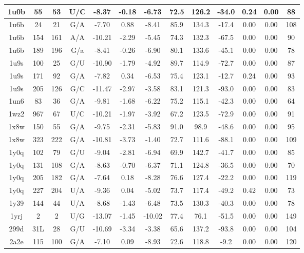 {\begin{center}
\begin{longtable}{|c|c|c|c|c|c|c|c|c|c|c|c|c|}
1u0b & 55 & 53 & U/C & -8.37 & -0.18 & -6.73 & 72.5 & 126.2 & -34.0 & 0.24 & 0.00 & 88 \\ \hline
1u6b & 24 & 21 & G/A & -7.70 & 0.88 & -8.41 & 85.9 & 134.3 & -17.4 & 0.00 & 0.00 & 108 \\ \hline
1u6b & 154 & 161 & A/A & -10.21 & -2.29 & -5.45 & 74.3 & 132.3 & -67.5 & 0.00 & 0.00 & 90 \\ \hline
1u6b & 189 & 196 & G/a & -8.41 & -0.26 & -6.90 & 80.1 & 133.6 & -45.1 & 0.00 & 0.00 & 78 \\ \hline
1u9s & 100 & 25 & G/U & -10.90 & -1.79 & -4.92 & 89.7 & 114.9 & -72.7 & 0.00 & 0.00 & 87 \\ \hline
1u9s & 171 & 92 & G/A & -7.82 & 0.34 & -6.53 & 75.4 & 123.1 & -12.7 & 0.24 & 0.00 & 93 \\ \hline
1u9s & 205 & 126 & G/C & -11.47 & -2.97 & -3.58 & 83.1 & 121.3 & -93.0 & 0.00 & 0.00 & 83 \\ \hline
1un6 & 83 & 36 & G/A & -9.81 & -1.68 & -6.22 & 75.2 & 115.1 & -42.3 & 0.00 & 0.00 & 64 \\ \hline
1wz2 & 967 & 67 & U/C & -10.21 & -1.97 & -3.92 & 67.2 & 123.5 & -72.9 & 0.00 & 0.00 & 91 \\ \hline
1x8w & 150 & 55 & G/A & -9.75 & -2.31 & -5.83 & 91.0 & 98.9 & -48.6 & 0.00 & 0.00 & 95 \\ \hline
1x8w & 323 & 222 & G/A & -10.81 & -3.73 & -1.40 & 72.7 & 111.6 & -88.1 & 0.00 & 0.00 & 109 \\ \hline
1y0q & 102 & 79 & G/U & -9.04 & -2.81 & -6.94 & 69.9 & 142.7 & -41.7 & 0.00 & 0.00 & 85 \\ \hline
1y0q & 131 & 108 & G/A & -8.63 & -0.70 & -6.37 & 71.1 & 124.8 & -36.5 & 0.00 & 0.00 & 70 \\ \hline
1y0q & 205 & 182 & G/A & -7.64 & 0.18 & -8.28 & 76.6 & 127.4 & -22.2 & 0.00 & 0.00 & 119 \\ \hline
1y0q & 227 & 204 & U/A & -9.36 & 0.04 & -5.02 & 73.7 & 117.4 & -49.2 & 0.42 & 0.00 & 73 \\ \hline
1y39 & 144 & 44 & U/A & -8.68 & -1.43 & -6.48 & 73.5 & 130.3 & -40.3 & 0.00 & 0.00 & 78 \\ \hline
1yrj & 2 & 2 & U/G & -13.07 & -1.45 & -10.02 & 77.4 & 76.1 & -51.5 & 0.00 & 0.00 & 149 \\ \hline
299d & 31L & 28 & G/U & -10.69 & -3.34 & -3.38 & 65.6 & 137.2 & -93.8 & 0.00 & 0.00 & 104 \\ \hline
2a2e & 115 & 100 & G/A & -7.10 & 0.09 & -8.93 & 72.6 & 118.8 & -9.2 & 0.00 & 0.00 & 120 \\ \hline

\end{longtable}
\end{center}}
